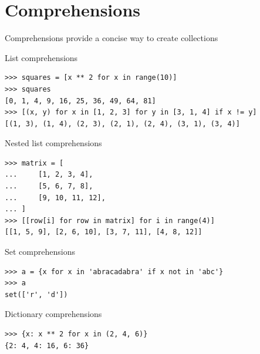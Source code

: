 \documentclass[8pt,a4paper,compress]{beamer}
\begin{document}
\section{Comprehensions}
\begin{frame}[fragile]
\pause

Comprehensions provide a concise way to create collections

\pause
\bigskip

List comprehensions
\begin{lstlisting}[language={}]
>>> squares = [x ** 2 for x in range(10)]
>>> squares
[0, 1, 4, 9, 16, 25, 36, 49, 64, 81]
>>> [(x, y) for x in [1, 2, 3] for y in [3, 1, 4] if x != y]
[(1, 3), (1, 4), (2, 3), (2, 1), (2, 4), (3, 1), (3, 4)]
\end{lstlisting}

\pause
\bigskip

Nested list comprehensions
\begin{lstlisting}[language={}]
>>> matrix = [
...     [1, 2, 3, 4],
...     [5, 6, 7, 8],
...     [9, 10, 11, 12],
... ]
>>> [[row[i] for row in matrix] for i in range(4)]
[[1, 5, 9], [2, 6, 10], [3, 7, 11], [4, 8, 12]]
\end{lstlisting}

\pause
\bigskip

Set comprehensions
\begin{lstlisting}[language={}]
>>> a = {x for x in 'abracadabra' if x not in 'abc'}
>>> a
set(['r', 'd'])
\end{lstlisting}

\pause
\bigskip

Dictionary comprehensions
\begin{lstlisting}[language={}]
>>> {x: x ** 2 for x in (2, 4, 6)}
{2: 4, 4: 16, 6: 36}
\end{lstlisting}
\end{frame}
\end{document}
